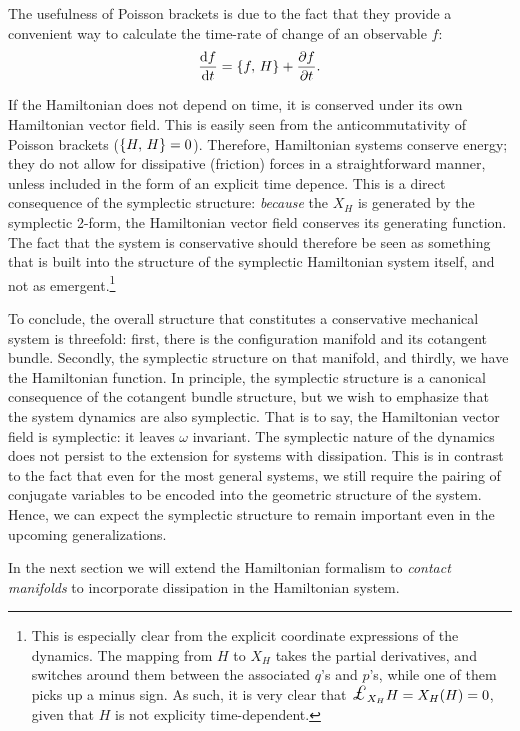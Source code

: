 The usefulness of Poisson brackets is due to the fact that they provide a convenient way to calculate the time-rate of change of an observable $f$: 
$$
    \dv{f}{t} = \qty{f,\,H} + \pdv{f}{t}.
$$

If the Hamiltonian does not depend on time, it is conserved under its own Hamiltonian vector field. This is easily seen from the anticommutativity of Poisson brackets ($\qty{H,\,H} = 0$). Therefore, Hamiltonian systems conserve energy; they do not allow for dissipative (friction) forces in a straightforward manner, unless included in the form of an explicit time depence. This is a direct consequence of the symplectic structure: \emph{because} the $X_H$ is generated by the symplectic 2-form, the Hamiltonian vector field conserves its generating function. The fact that the system is conservative should therefore be seen as something that is built into the structure of the symplectic Hamiltonian system itself, and not as emergent.\footnote{This is especially clear from the explicit coordinate expressions of the dynamics. The mapping from $H$ to $X_H$ takes the partial derivatives, and switches around them between the associated $q$'s and $p$'s, while one of them picks up a minus sign. As such, it is very clear that $\lied{X_H}{H} = X_H(H) = 0$, given that $H$ is not explicity time-dependent.}

To conclude, the overall structure that constitutes a conservative mechanical system is threefold: first, there is the configuration manifold and its cotangent bundle. Secondly, the symplectic structure on that manifold, and thirdly, we have the Hamiltonian function. In principle, the symplectic structure is a canonical consequence of the cotangent bundle structure, but we wish to emphasize that the system dynamics are also symplectic. That is to say, the Hamiltonian vector field is symplectic: it leaves $\omega$ invariant. The symplectic nature of the dynamics does not persist to the extension for systems with dissipation. This is in contrast to the fact that even for the most general systems, we still require the pairing of conjugate variables to be encoded into the geometric structure of the system. Hence, we can expect the symplectic structure to remain important even in the upcoming generalizations.

In the next section we will extend the Hamiltonian formalism to \emph{contact manifolds} to incorporate dissipation in the Hamiltonian system.
